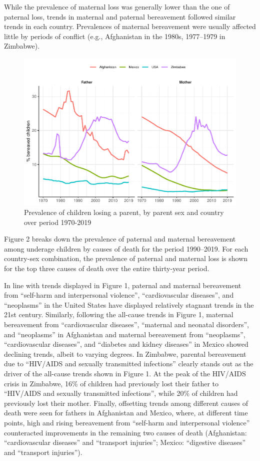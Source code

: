 \documentclass[
  11pt,
  letterpaper,
]{article}
\begin{document}
While the prevalence of maternal loss was generally lower than the one of paternal loss, trends in maternal and paternal bereavement followed similar trends in each country. Prevalences of maternal bereavement were usually affected little by periods of conflict (e.g., Afghanistan in the 1980s, 1977--1979 in Zimbabwe).

\begin{figure}
\centering
\includegraphics{parental_loss_global_paa_ext_abstract_files/figure-latex/perc-ber-all-1.pdf}
\caption{\label{fig:perc-ber-all}Prevalence of children losing a parent, by parent sex and country over period 1970-2019}
\end{figure}

Figure 2 breaks down the prevalence of paternal and maternal bereavement among underage children by causes of death for the period 1990--2019. For each country-sex combination, the prevalence of paternal and maternal loss is shown for the top three causes of death over the entire thirty-year period.

In line with trends displayed in Figure 1, paternal and maternal bereavement from ``self-harm and interpersonal violence'', ``cardiovascular diseases'', and ``neoplasms'' in the United States have displayed relatively stagnant trends in the 21st century. Similarly, following the all-cause trends in Figure 1, maternal bereavement from ``cardiovascular diseases'', ``maternal and neonatal disorders'', and ``neoplasms'' in Afghanistan and maternal bereavement from ``neoplasms'', ``cardiovascular diseases'', and ``diabetes and kidney diseases'' in Mexico showed declining trends, albeit to varying degrees. In Zimbabwe, parental bereavement due to ``HIV/AIDS and sexually transmitted infections'' clearly stands out as the driver of the all-cause trends shown in Figure 1. At the peak of the HIV/AIDS crisis in Zimbabwe, 16\% of children had previously lost their father to ``HIV/AIDS and sexually transmitted infections'', while 20\% of children had previously lost their mother. Finally, offsetting trends among different causes of death were seen for fathers in Afghanistan and Mexico, where, at different time points, high and rising bereavement from ``self-harm and interpersonal violence'' counteracted improvements in the remaining two causes of death (Afghanistan: ``cardiovascular diseases'' and ``transport injuries''; Mexico: ``digestive diseases'' and ``transport injuries'').
\end{document}
